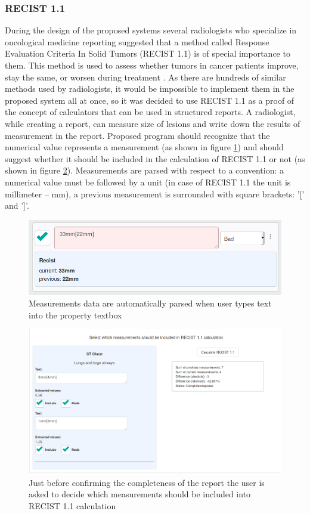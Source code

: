 \documentclass[12pt, twoside, openany]{report}
\theoremstyle{definition}
\begin{document}
\subsubsection{RECIST 1.1}
During the design of the proposed systems several radiologists who specialize in oncological medicine reporting suggested that a method called Response Evaluation Criteria In Solid Tumors (RECIST 1.1) is of special importance to them. This method is used to assess whether tumors in cancer patients improve, stay the same, or worsen during treatment \cite{wiki-recist}. As there are hundreds of similar methods used by radiologists, it would be impossible to implement them in the proposed system all at once, so it was decided to use RECIST 1.1 as a proof of the concept of calculators that can be used in structured reports.
A radiologist, while creating a report, can measure size of lesions and write down the results of measurement in the report. Proposed program should recognize that the numerical value represents a measurement (as shown in figure \ref{fig:recist-parsing}) and should suggest whether it should be included in the calculation of RECIST 1.1 or not (as shown in figure \ref{fig:recist-config}). Measurements are parsed with respect to a convention: a numerical value must be followed by a unit (in case of RECIST 1.1 the unit is millimeter -- mm), a previous measurement is surrounded with square brackets: '[' and ']'.

\begin{figure}
	\centering
	\includegraphics[width=0.8\linewidth]{recist-parsing}
	\caption{Measurements data are automatically parsed when user types text into the property textbox
		\label{fig:recist-parsing}
	}
\end{figure}

\begin{figure}
	\begin{center}
	\includegraphics[width=\linewidth]{recist-config}
	\caption{Just before confirming the completeness of the report the user is asked to decide which measurements should be included into RECIST 1.1 calculation
		\label{fig:recist-config}}
		\end{center}
\end{figure}
\end{document}
